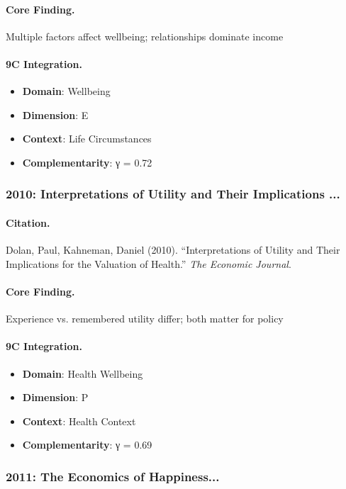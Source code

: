 \paragraph{Core Finding.}
Multiple factors affect wellbeing; relationships dominate income

\paragraph{9C Integration.}
\begin{itemize}[nosep]
  \item \textbf{Domain}: Wellbeing
  \item \textbf{Dimension}: E
  \item \textbf{Context}: Life Circumstances
  \item \textbf{Complementarity}: γ = 0.72
\end{itemize}

\subsubsection{2010: Interpretations of Utility and Their Implications ...}

\paragraph{Citation.}
Dolan, Paul, Kahneman, Daniel (2010). ``Interpretations of Utility and Their Implications for the Valuation of Health.''
\textit{The Economic Journal}.

\paragraph{Core Finding.}
Experience vs. remembered utility differ; both matter for policy

\paragraph{9C Integration.}
\begin{itemize}[nosep]
  \item \textbf{Domain}: Health Wellbeing
  \item \textbf{Dimension}: P
  \item \textbf{Context}: Health Context
  \item \textbf{Complementarity}: γ = 0.69
\end{itemize}

\subsubsection{2011: The Economics of Happiness...}

